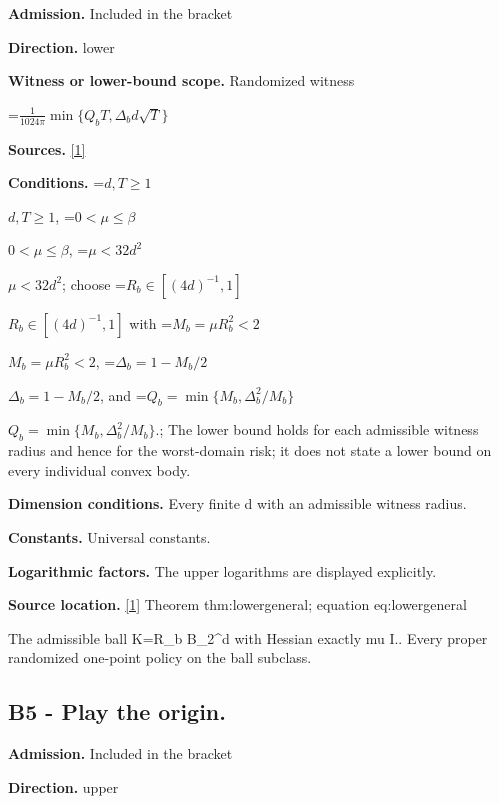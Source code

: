 \documentclass[10pt,a4paper]{article}
\newcommand{\AtlasMath}[1]{\par\begingroup\centering\setbox0=\hbox{$\displaystyle #1$}\ifdim\wd0>1.4\linewidth\typeout{ATLAS WIDE FORMULA: \the\wd0}\fi\ifdim\wd0>\linewidth\resizebox{\linewidth}{!}{\box0}\else\box0\fi\par\endgroup}
\newcommand{\AtlasInlineMath}[1]{\begingroup\setbox0=\hbox{$#1$}\ifdim\wd0>.4\linewidth\endgroup\AtlasMath{#1}\else\endgroup$#1$\fi}
\begin{document}
\textbf{Admission.} Included in the bracket



\textbf{Direction.} lower



\textbf{Witness or lower-bound scope.} Randomized witness



\AtlasMath{\frac{1}{1024\pi}\min\{Q_bT,\Delta_bd\sqrt T\}}


\textbf{Sources.} \href{https://github.com/WU-Wendao/Colombo/blob/main/colombo_sensorium/Complexity_altas/data/sources/colombo/U01/manuscript.pdf}{[1]}



\textbf{Conditions.} \AtlasInlineMath{d,T\ge1}, \AtlasInlineMath{0<\mu\le\beta}, \AtlasInlineMath{\mu<32d^2}; choose \AtlasInlineMath{R_b\in[(4d)^{-1},1]} with \AtlasInlineMath{M_b=\mu R_b^2<2}, \AtlasInlineMath{\Delta_b=1-M_b/2}, and \AtlasInlineMath{Q_b=\min\{M_b,\Delta_b^2/M_b\}}.; The lower bound holds for each admissible witness radius and hence for the worst-domain risk; it does not state a lower bound on every individual convex body.



\textbf{Dimension conditions.} Every finite d with an admissible witness radius.



\textbf{Constants.} Universal constants.



\textbf{Logarithmic factors.} The upper logarithms are displayed explicitly.



\textbf{Source location.} \href{https://github.com/WU-Wendao/Colombo/blob/main/colombo_sensorium/Complexity_altas/data/sources/colombo/U01/manuscript.pdf}{[1]} Theorem thm:lowergeneral; equation eq:lowergeneral



The admissible ball K=R\_b B\_2\textasciicircum{}d with Hessian exactly mu I.. Every proper randomized one-point policy on the ball subclass.



\subsection{B5 - Play the origin.}


\textbf{Admission.} Included in the bracket



\textbf{Direction.} upper
\end{document}
